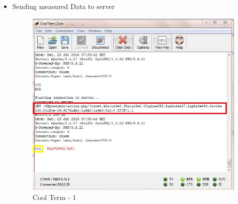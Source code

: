 \documentclass[a4paper,12pt,oneside]{book}
\begin{document}
\begin{itemize}
	\setlength\itemsep{0.2cm}
	\item{Sending measured Data to server}
	\begin{itemize}
		
		\begin{figure}[H]
			\centering
			\includegraphics[width=15cm]{coolterm1.jpg}
			\caption{Cool Term - 1}
			\label{29}
		\end{figure}
		

\end{itemize}
\end{itemize}
\end{document}
